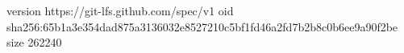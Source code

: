 version https://git-lfs.github.com/spec/v1
oid sha256:65b1a3e354dad875a3136032e8527210c5bf1fd46a2fd7b2b8c0b6ee9a90f2be
size 262240
